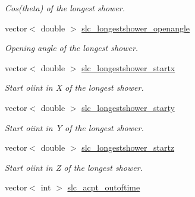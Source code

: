 \begin{DoxyCompactItemize}
\begin{DoxyCompactList}\small\item\em Cos(theta) of the longest shower. \end{DoxyCompactList}\item 
\hypertarget{classUBXSecEvent_ad53e2bf33ff69e69c60443f12b6ed9e6}{vector$<$ double $>$ \hyperlink{classUBXSecEvent_ad53e2bf33ff69e69c60443f12b6ed9e6}{slc\-\_\-longestshower\-\_\-openangle}}\label{classUBXSecEvent_ad53e2bf33ff69e69c60443f12b6ed9e6}

\begin{DoxyCompactList}\small\item\em Opening angle of the longest shower. \end{DoxyCompactList}\item 
\hypertarget{classUBXSecEvent_a4bbe4dd480325e85cb3a51a018651cf2}{vector$<$ double $>$ \hyperlink{classUBXSecEvent_a4bbe4dd480325e85cb3a51a018651cf2}{slc\-\_\-longestshower\-\_\-startx}}\label{classUBXSecEvent_a4bbe4dd480325e85cb3a51a018651cf2}

\begin{DoxyCompactList}\small\item\em Start oiint in X of the longest shower. \end{DoxyCompactList}\item 
\hypertarget{classUBXSecEvent_a8fc3be7a9c40664b2615ca8c079c05c9}{vector$<$ double $>$ \hyperlink{classUBXSecEvent_a8fc3be7a9c40664b2615ca8c079c05c9}{slc\-\_\-longestshower\-\_\-starty}}\label{classUBXSecEvent_a8fc3be7a9c40664b2615ca8c079c05c9}

\begin{DoxyCompactList}\small\item\em Start oiint in Y of the longest shower. \end{DoxyCompactList}\item 
\hypertarget{classUBXSecEvent_ae022f809b2c73280c6c9eda7cbf18bab}{vector$<$ double $>$ \hyperlink{classUBXSecEvent_ae022f809b2c73280c6c9eda7cbf18bab}{slc\-\_\-longestshower\-\_\-startz}}\label{classUBXSecEvent_ae022f809b2c73280c6c9eda7cbf18bab}

\begin{DoxyCompactList}\small\item\em Start oiint in Z of the longest shower. \end{DoxyCompactList}\item 
\hypertarget{classUBXSecEvent_afd52675b8ca60af2941105f9739909a4}{vector$<$ int $>$ \hyperlink{classUBXSecEvent_afd52675b8ca60af2941105f9739909a4}{slc\-\_\-acpt\-\_\-outoftime}}\label{classUBXSecEvent_afd52675b8ca60af2941105f9739909a4}


\end{DoxyCompactItemize}
